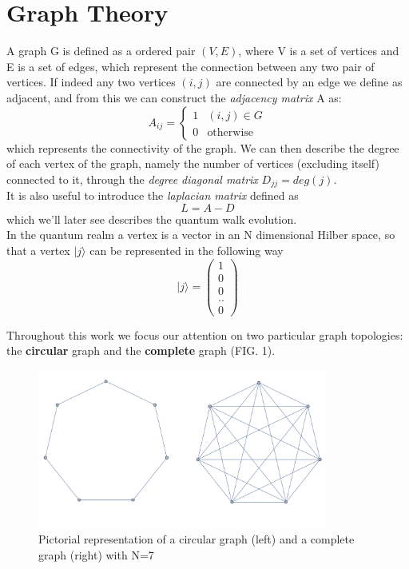 \documentclass[11pt, twoside]{report}
\begin{document}
\section{Graph Theory}
A graph G is defined as a ordered pair $(V,E)$, where V is a set of vertices and E is a set of edges, which represent the connection between any two pair of vertices. If indeed any two vertices $(i,j)$ are connected by an edge we define as adjacent, and from this we can construct the \textit{adjacency matrix} A as:
\begin{equation}
A_{ij} = \begin{cases} 1 & (i,j)\in G \\ 0 & \mbox{otherwise} \end{cases}
\end{equation}
which represents the connectivity of the graph. We can then describe the degree of each vertex of the graph, namely the number of vertices (excluding itself) connected to it, through the \textit{degree diagonal matrix} $D_{jj} = deg(j)$.\\
It is also useful to introduce the \textit{laplacian matrix} defined as
\begin{equation}
  L = A-D
\end{equation}
which we'll later see describes the quantum walk evolution.\\
In the quantum realm a vertex is a vector in an N dimensional Hilber space, so that a vertex $|j\rangle$ can be represented in the following way
\begin{equation}
  |j\rangle = \begin{pmatrix} 1 \\ 0 \\ 0 \\ .. \\0 \end{pmatrix}
\end{equation}

Throughout this work we focus our attention on two particular graph topologies: the \textbf{circular} graph and the \textbf{complete} graph (FIG. 1).


\begin{figure}[ht]
\centering
\includegraphics[width=9.5cm]{./figures/graph.png}%
\caption[Pictorial representation of circular and complete graph]{Pictorial representation of a circular graph (left) and a complete graph (right) with N=7}
\end{figure}
\end{document}
